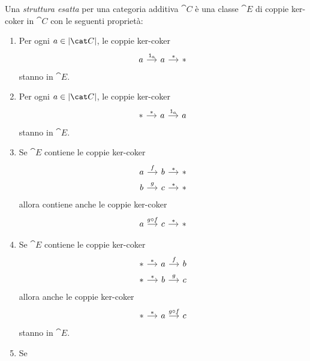 \begin{definition}\label{definition:CategorieEsatte}
  Una {\em struttura esatta} per una categoria additiva \(\cat C\) è
  una classe \(\cat E\) di coppie ker-coker in \(\cat C\) con le
  seguenti proprietà:
  \begin{enumerate}[leftmargin=*, label=(E\arabic*),
    ref=Definizione~\ref{definition:CategorieEsatte}-E\arabic*]
  \item \label{item:EO} Per ogni \(a \in \objcat C\), le coppie
    ker-coker
    \[
      \begin{tikzcd}[column sep=small]
        a \ar["{\id_a}", r] & a \ar["{\ast}", r] & \ast
      \end{tikzcd}
    \]
    stanno in \(\cat E\).
  \item \label{item:EOop} Per ogni \(a \in \objcat C\), le coppie
    ker-coker
    \[
      \begin{tikzcd}[column sep=small]
        \ast \ar["{\ast}", r] & a \ar["{\id_a}", r] & a
      \end{tikzcd}
    \]
    stanno in \(\cat E\).
  \item \label{item:E1} Se \(\cat E\) contiene le coppie ker-coker
    \[
      \begin{tikzcd}[column sep=small, row sep=tiny]
        a \ar["{f}", r] & b \ar["{\ast}", r] & \ast \\
        b \ar["{g}", r] & c \ar["{\ast}", r] & \ast
      \end{tikzcd}
    \]
    allora contiene anche le coppie ker-coker
    \[
      \begin{tikzcd}[column sep=small]
        a \ar["{g \circ f}", r] & c \ar["{\ast}", r] & \ast
      \end{tikzcd}
    \]
  \item \label{item:E1op} Se \(\cat E\) contiene le coppie ker-coker
    \[
      \begin{tikzcd}[column sep=small, row sep=tiny]
        \ast \ar["{\ast}", r] & a \ar["{f}", r] & b \\
        \ast \ar["{\ast}", r] & b \ar["{g}", r] & c
      \end{tikzcd}
    \]
    allora anche le coppie ker-coker
    \[
      \begin{tikzcd}[column sep=small]
        \ast \ar["{\ast}", r] & a \ar["{g \circ f}", r] & c
      \end{tikzcd}
    \]
    stanno in \(\cat E\).
  \item \label{item:E2} Se
    \[
      \begin{tikzcd}[column sep=small]

\end{tikzcd}\]
\end{enumerate}
\end{definition}

